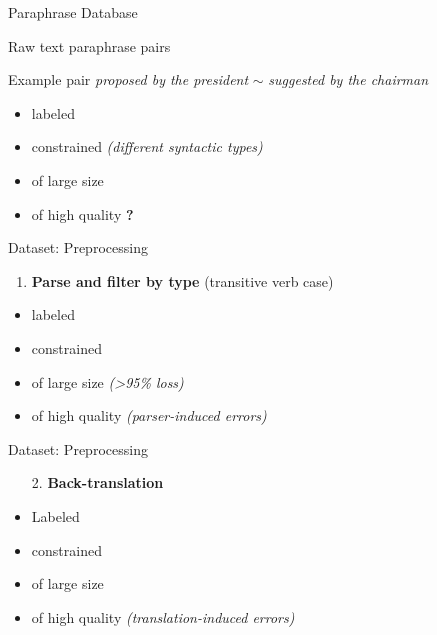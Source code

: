 \documentclass{beamer}
\newcommand{\xmark}{\ding{55}}
\begin{document}
\begin{frame}{Paraphrase Database}

	Raw text paraphrase pairs
	
	
	\begin{block}{Example pair}
	\small \textit{proposed by the president} $\sim$ \textit{suggested by the chairman}
	\end{block}
	
	\begin{itemize}
	\item labeled \textcolor{Yes}{\checkmark}
	\item constrained \textcolor{No}{\xmark}
	\footnotesize\textit{(different syntactic types)}
	\normalsize
	\item of large size \textcolor{Yes}{\checkmark}
	\item of high quality \textcolor{Maybe}{\textbf{?}}
	\end{itemize}
\end{frame}

\begin{frame}{Dataset: Preprocessing}

	\begin{enumerate}
	\item \textbf{Parse and filter by type} (transitive verb case)
	\end{enumerate}

	\begin{itemize}
	\item labeled \textcolor{Yes}{\checkmark}
	\item constrained \textcolor{Yes}{\checkmark}
	\item of large size \textcolor{No}{\xmark} 
	\footnotesize\textit{(>95\% loss)} 
	\normalsize
	\item of high quality \textcolor{No}{\xmark}
	\footnotesize\textit{(parser-induced errors)} 
	\normalsize
	\end{itemize}
\end{frame}

\begin{frame}{Dataset: Preprocessing}

	\begin{enumerate}
	\item[2.] \textbf{Back-translation}
	\end{enumerate}

	\begin{itemize}
	\item Labeled \textcolor{Yes}{\checkmark}
	\item constrained \textcolor{Yes}{\checkmark}
	\item of large size \textcolor{Yes}{\checkmark}
	\item of high quality \textcolor{No}{\xmark}
	\footnotesize\textit{(translation-induced errors)}
	\normalsize
	\end{itemize}
\end{frame}
\end{document}
